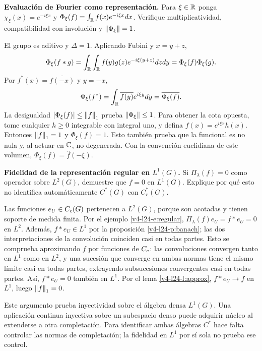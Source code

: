 \begin{ejercicio}\label{ej:v4-l24-4}
\textbf{Evaluación de Fourier como representación.}
Para $\xi\in\mathbb R$ ponga $\chi_\xi(x)=e^{-i\xi x}$ y $\Phi_\xi(f)=\int_\mathbb R f(x)e^{-i\xi x}dx$. Verifique multiplicatividad, compatibilidad con involución y $\left\lVert\Phi_\xi\right\rVert=1$.

\end{ejercicio}
\begin{solucion} El grupo es aditivo y $\Delta=1$. Aplicando Fubini y $x=y+z$,
\[
\Phi_\xi(f*g)=\int_\mathbb R\int_\mathbb R f(y)g(z)e^{-i\xi(y+z)}dzdy
=\Phi_\xi(f)\Phi_\xi(g).
\]
Por $f^*(x)=\overline{f(-x)}$ y $y=-x$,
\[
\Phi_\xi(f^*)=\int_\mathbb R\overline{f(y)}e^{i\xi y}dy
=\overline{\Phi_\xi(f)}.
\]
La desigualdad $|\Phi_\xi(f)|\leq\left\lVert f\right\rVert_1$ prueba $\left\lVert\Phi_\xi\right\rVert\leq1$. Para obtener la cota opuesta, tome cualquier $h\geq0$ integrable con integral uno, y defina $f(x)=e^{i\xi x}h(x)$. Entonces $\left\lVert f\right\rVert_1=1$ y $\Phi_\xi(f)=1$. Esto también prueba que la funcional es no nula y, al actuar en $\mathbb C$, no degenerada.
Con la convención euclidiana de este volumen, $\Phi_\xi(f)=\widehat f(-\xi)$.
\end{solucion}

\begin{ejercicio}\label{ej:v4-l24-5}
\textbf{Fidelidad de la representación regular en $L^1(G)$.}
Si $\Pi_\lambda(f)=0$ como operador sobre $L^2(G)$, demuestre que $f=0$ en $L^1(G)$. Explique por qué esto no identifica automáticamente $C^*(G)$ con $C_r^*(G)$.

\end{ejercicio}
\begin{solucion} Las funciones $e_U\in C_c(G)$ pertenecen a $L^2(G)$, porque son acotadas y tienen soporte de medida finita. Por el ejemplo \ref{v4-l24-e:regular}, $\Pi_\lambda(f)e_U=f*e_U=0$ en $L^2$. Además, $f*e_U\in L^1$ por la proposición \ref{v4-l24-p:banach}; las dos interpretaciones de la convolución coinciden casi en todas partes. Esto se comprueba aproximando $f$ por funciones de $C_c$: las convoluciones convergen tanto en $L^1$ como en $L^2$, y una sucesión que converge en ambas normas tiene el mismo límite casi en todas partes, extrayendo subsucesiones convergentes casi en todas partes. Así, $f*e_U=0$ también en $L^1$. Por el lema \ref{v4-l24-l:approx}, $f*e_U\to f$ en $L^1$, luego $\left\lVert f\right\rVert_1=0$.

Este argumento prueba inyectividad sobre el álgebra densa $L^1(G)$. Una aplicación continua inyectiva sobre un subespacio denso puede adquirir núcleo al extenderse a otra completación. Para identificar ambas álgebras $C^*$ hace falta controlar las normas de completación; la fidelidad en $L^1$ por sí sola no prueba ese control.\end{solucion}


